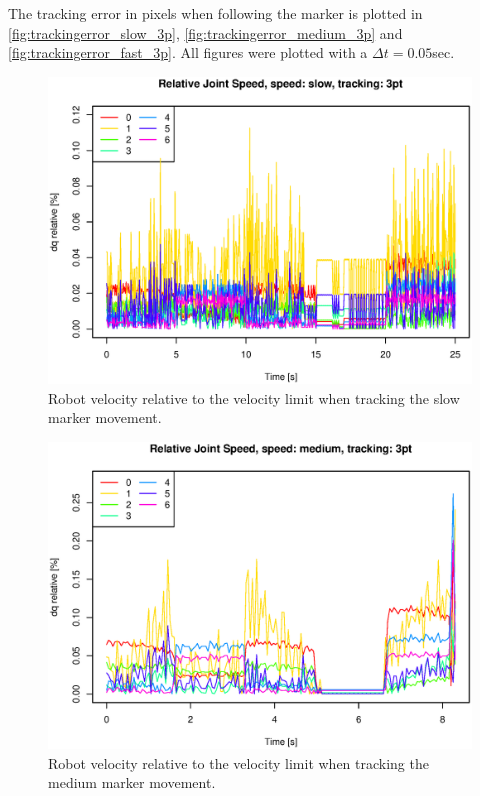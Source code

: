 The tracking error in pixels when following the marker is plotted in \ref{fig:trackingerror_slow_3p}, \ref{fig:trackingerror_medium_3p} and \ref{fig:trackingerror_fast_3p}.
All figures were plotted with a $\Delta t = 0.05$sec.



\begin{figure}[H]
\centering
\includegraphics[width= \fullImageWidth]{graphics/robotics/relativeConfVel_slow_3pt}
\caption{Robot velocity relative to the velocity limit when tracking the slow marker movement.}
\label{fig:robotspeed_slow_3p}
\end{figure}

\begin{figure}[H]
\centering
\includegraphics[width= \fullImageWidth]{graphics/robotics/relativeConfVel_medium_3pt}
\caption{Robot velocity relative to the velocity limit when tracking the medium marker movement.}
\label{fig:robotspeed_medium_3p}
\end{figure}


